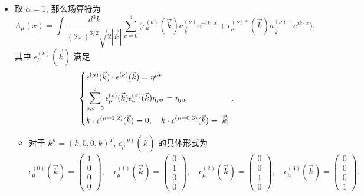 \begin{itemize}
	\item 取 $\alpha = 1$, 那么场算符为
	\begin{equation}
		A_\mu(x) = \int \frac{d^3 k}{(2 \pi)^{3 / 2} \sqrt{2 |\vec{k}|}} \sum_{\nu = 0}^3 \Big( \epsilon^{(\nu)}_\mu(\vec{k}) a^{(\nu)}_{\vec{k}} e^{- i k \cdot x} + \epsilon^{(\nu) *}_\mu(\vec{k}) a^{(\nu) \dag}_{\vec{k}} e^{i k \cdot x} \Big),
	\end{equation}
	其中 $\epsilon^{(\nu)}_\mu(\vec{k})$ 满足
	\begin{equation}
		\begin{dcases}
			\epsilon^{(\mu)}(\vec{k}) \cdot \epsilon^{(\nu)}(\vec{k}) = \eta^{\mu \nu} \\
			\sum_{\rho, \sigma = 0}^3 \epsilon^{(\rho)}_\mu(\vec{k}) \epsilon^{(\sigma)}_\nu(\vec{k}) \eta_{\rho \sigma} = \eta_{\mu \nu} \\
			k \cdot \epsilon^{(\mu = 1, 2)}(\vec{k}) = 0, \quad k \cdot \epsilon^{(\mu = 0, 3)}(\vec{k}) = |\vec{k}|
		\end{dcases}.
	\end{equation}
	\begin{itemize}
		\item 对于 $k^\mu = (k, 0, 0, k)^T$, $\epsilon^{(\nu)}_\mu(\vec{k})$ 的具体形式为
		\begin{equation}
			\epsilon^{(0)}_\mu(\vec{k}) = \begin{pmatrix}
				1 \\
				0 \\
				0 \\
				0
			\end{pmatrix}, \quad \epsilon^{(1)}_\mu(\vec{k}) = \begin{pmatrix}
				0 \\
				1 \\
				0 \\
				0
			\end{pmatrix}, \quad \epsilon^{(2)}_\mu(\vec{k}) = \begin{pmatrix}
				0 \\
				0 \\
				1 \\
				0
			\end{pmatrix}, \quad \epsilon^{(3)}_\mu(\vec{k}) = \begin{pmatrix}
				0 \\
				0 \\
				0 \\
				1
			\end{pmatrix}.
		\end{equation}
		

\end{itemize}
\end{itemize}
